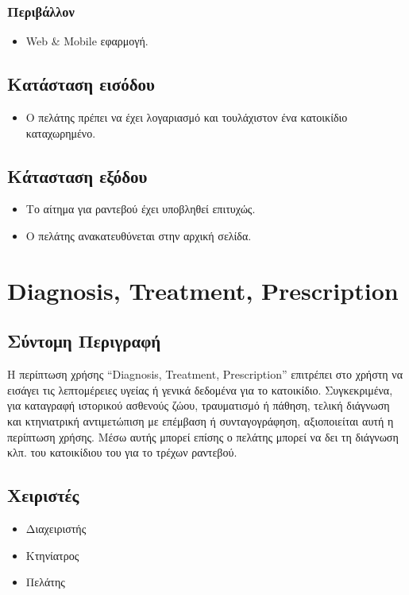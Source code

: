 \documentclass[12pt,a4paper,twoside]{book}
\begin{document}
\subsubsection{Περιβάλλον}
\begin{itemize}
  \item Web \& Mobile εφαρμογή.
\end{itemize}

\subsection{Κατάσταση εισόδου} %
\begin{itemize}
  \item Ο πελάτης πρέπει να έχει λογαριασμό και τουλάχιστον ένα κατοικίδιο καταχωρημένο. %
\end{itemize}

\subsection{Κάτασταση εξόδου} %
\begin{itemize}
  \item Το αίτημα για ραντεβού έχει υποβληθεί επιτυχώς.
  \item Ο πελάτης ανακατευθύνεται στην αρχική σελίδα. %
\end{itemize}

\section{Diagnosis, Treatment, Prescription}

\subsection{Σύντομη Περιγραφή}
Η περίπτωση χρήσης “Diagnosis, Treatment, Prescription” επιτρέπει στο χρήστη να εισάγει τις λεπτομέρειες υγείας ή γενικά δεδομένα για το κατοικίδιο. Συγκεκριμένα, για καταγραφή ιστορικού ασθενούς ζώου, τραυματισμό ή πάθηση, τελική διάγνωση και κτηνιατρική αντιμετώπιση με επέμβαση ή συνταγογράφηση, αξιοποιείται αυτή η περίπτωση χρήσης. Μέσω αυτής μπορεί επίσης ο πελάτης μπορεί να δει τη διάγνωση κλπ. του κατοικίδιου του για το τρέχων ραντεβού.  %

\subsection{Χειριστές}
\begin{itemize}
  \item Διαχειριστής
  \item Κτηνίατρος
  \item Πελάτης
\end{itemize}
\end{document}

